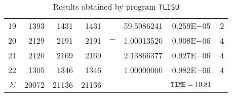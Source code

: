 \documentclass{esub2acm}
\begin{document}
\begin{table}
\begin{tabular}{c|rrrr@{}lcc}
19  &   1393    &   1431    &   1431    &       &   59.5986241  &   0.259E$-$05 &   2   \\
20  &   2129    &   2191    &   2191    &   $-$ &   1.00013520  &   0.908E$-$06 &   4   \\
21  &   2120    &   2169    &   2169    &       &   2.13866377  &   0.927E$-$06 &   4   \\
22  &   1305    &   1346    &   1346    &       &   1.00000000  &   0.982E$-$06 &   4   \\ \hline
$\Sigma$\rule[-2pt]{0pt}{12pt}  &   20072   &   21136   &   21136   &       &       &   ${\tt TIME} = 10.81$   &       \\ \hline
\end{tabular}
\caption{Results obtained by program {\tt TLISU}}
\label{tlisu}
\end{table}
\end{document}
